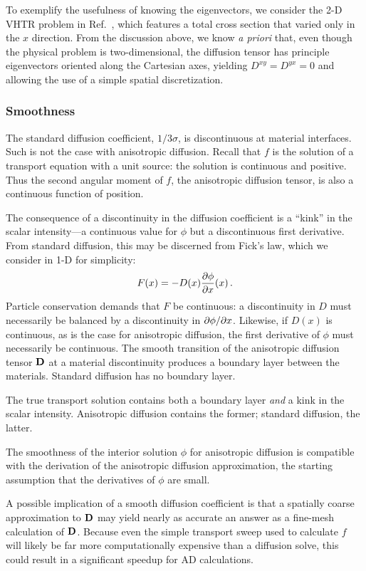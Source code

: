 To exemplify the usefulness of knowing the eigenvectors, we consider the 2-D
VHTR problem in Ref.~\cite{Lar2009c}, which features a total cross section that
varied only in the $x$ direction. From the discussion above, we know
\emph{a priori} that, even though the physical problem is two-dimensional,
the diffusion tensor has principle
eigenvectors oriented along the Cartesian axes, yielding $D^{xy}=D^{yx}=0$ and
allowing the use of a simple spatial discretization.

\subsubsection{Smoothness}\label{sec:adSmoothness}

The standard diffusion coefficient, $1/3\sigma$, is discontinuous at material
interfaces. Such is not the case with anisotropic diffusion. Recall that $f$ is
the solution of a transport equation with a unit source: the solution is
continuous and positive. Thus the second angular moment of $f$, the
anisotropic diffusion tensor, is also a continuous function of position.

The consequence of a discontinuity in the diffusion coefficient is a ``kink'' in
the scalar intensity---a continuous value for $\phi$ but a discontinuous first
derivative. From standard diffusion, this may be discerned from Fick's law,
which we consider in 1-D for simplicity:
\begin{equation*}
  F(x) = - D(x) \frac{\partial \phi}{\partial x}(x)\,.
\end{equation*}
Particle conservation demands that $F$ be continuous: a discontinuity in $D$
must necessarily be balanced by a discontinuity in ${\partial \phi}/{\partial x}$.
Likewise, if $D(x)$ is continuous, as is the case for anisotropic diffusion, the
first derivative of $\phi$ must necessarily be continuous.
The smooth transition of the anisotropic diffusion tensor $\mathbf{D}$ at a material
discontinuity produces a boundary layer between the materials. Standard
diffusion has no boundary layer.

The true transport solution contains both a boundary layer \emph{and} a kink in
the scalar intensity. Anisotropic diffusion contains the former; standard
diffusion, the latter.

The smoothness of the interior solution $\phi$ for anisotropic diffusion is
compatible with the derivation of the anisotropic diffusion approximation, the
starting assumption that the derivatives of $\phi$ are small.

A possible implication of a smooth diffusion coefficient is that a spatially
coarse approximation to $\mathbf{D}$ may yield nearly as accurate an answer as a
fine-mesh calculation of $\mathbf{D}$. Because even the simple transport sweep used
to calculate $f$ will likely be far more computationally expensive than a
diffusion solve, this could result in a significant speedup for AD calculations.

